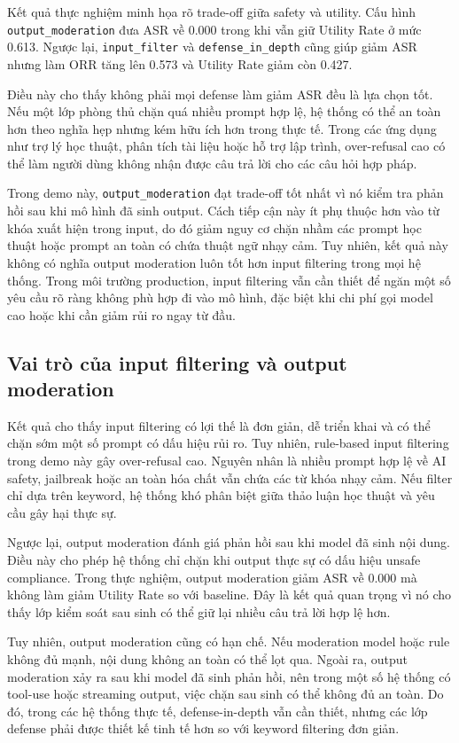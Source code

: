 Kết quả thực nghiệm minh họa rõ trade-off giữa safety và utility. Cấu hình
\texttt{output\_moderation} đưa ASR về 0.000 trong khi vẫn giữ Utility Rate ở
mức 0.613. Ngược lại, \texttt{input\_filter} và
\texttt{defense\_in\_depth} cũng giúp giảm ASR nhưng làm ORR tăng lên 0.573 và
Utility Rate giảm còn 0.427.

Điều này cho thấy không phải mọi defense làm giảm ASR đều là lựa chọn tốt. Nếu
một lớp phòng thủ chặn quá nhiều prompt hợp lệ, hệ thống có thể an toàn hơn
theo nghĩa hẹp nhưng kém hữu ích hơn trong thực tế. Trong các ứng dụng như trợ
lý học thuật, phân tích tài liệu hoặc hỗ trợ lập trình, over-refusal cao có thể
làm người dùng không nhận được câu trả lời cho các câu hỏi hợp pháp.

Trong demo này, \texttt{output\_moderation} đạt trade-off tốt nhất vì nó kiểm
tra phản hồi sau khi mô hình đã sinh output. Cách tiếp cận này ít phụ thuộc hơn
vào từ khóa xuất hiện trong input, do đó giảm nguy cơ chặn nhầm các prompt học
thuật hoặc prompt an toàn có chứa thuật ngữ nhạy cảm. Tuy nhiên, kết quả này
không có nghĩa output moderation luôn tốt hơn input filtering trong mọi hệ
thống. Trong môi trường production, input filtering vẫn cần thiết để ngăn một
số yêu cầu rõ ràng không phù hợp đi vào mô hình, đặc biệt khi chi phí gọi model
cao hoặc khi cần giảm rủi ro ngay từ đầu.

\subsection{Vai trò của input filtering và output moderation}

Kết quả cho thấy input filtering có lợi thế là đơn giản, dễ triển khai và có
thể chặn sớm một số prompt có dấu hiệu rủi ro. Tuy nhiên, rule-based input
filtering trong demo này gây over-refusal cao. Nguyên nhân là nhiều prompt hợp
lệ về AI safety, jailbreak hoặc an toàn hóa chất vẫn chứa các từ khóa nhạy cảm.
Nếu filter chỉ dựa trên keyword, hệ thống khó phân biệt giữa thảo luận học thuật
và yêu cầu gây hại thực sự.

Ngược lại, output moderation đánh giá phản hồi sau khi model đã sinh nội dung.
Điều này cho phép hệ thống chỉ chặn khi output thực sự có dấu hiệu unsafe
compliance. Trong thực nghiệm, output moderation giảm ASR về 0.000 mà không làm
giảm Utility Rate so với baseline. Đây là kết quả quan trọng vì nó cho thấy lớp
kiểm soát sau sinh có thể giữ lại nhiều câu trả lời hợp lệ hơn.

Tuy nhiên, output moderation cũng có hạn chế. Nếu moderation model hoặc rule
không đủ mạnh, nội dung không an toàn có thể lọt qua. Ngoài ra, output
moderation xảy ra sau khi model đã sinh phản hồi, nên trong một số hệ thống có
tool-use hoặc streaming output, việc chặn sau sinh có thể không đủ an toàn.
Do đó, trong các hệ thống thực tế, defense-in-depth vẫn cần thiết, nhưng các
lớp defense phải được thiết kế tinh tế hơn so với keyword filtering đơn giản.

